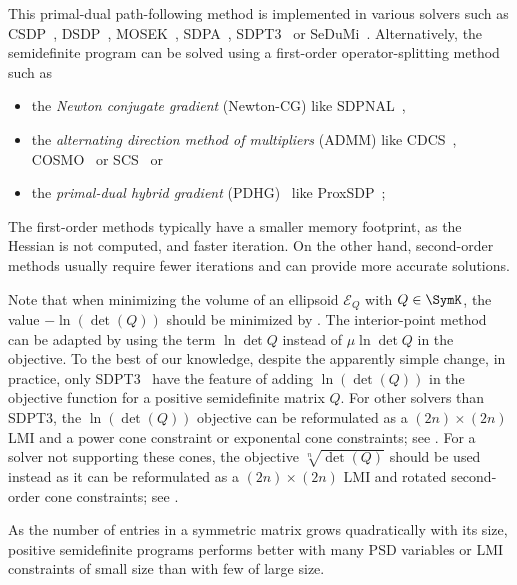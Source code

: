 \documentclass[11pt,twoside,a4paper,openright]{uclouvain-thesis}
\begin{document}
This primal-dual path-following method is implemented in various
solvers such as
    CSDP~\cite{borchers1999csdp}, %
    DSDP~\cite{dsdp1}, %
    MOSEK~\cite{mosek2017mosek81082},
    SDPA~\cite{yamashita2003implementation}, %
    SDPT3~\cite{tutuncu2003solving} or %
    SeDuMi~\cite{sturm1999using}. %
Alternatively, the semidefinite program can be solved using
a first-order operator-splitting method such as
\begin{itemize}
  \item the \emph{Newton conjugate gradient} (Newton-CG) like SDPNAL~\cite{yang2015sdpnal},
  \item the \emph{alternating direction method of multipliers} (ADMM) like CDCS~\cite{zheng2020chordal}, COSMO~\cite{garstka_2019} or SCS~\cite{ocpb:16} or
  \item the \emph{primal-dual hybrid gradient} (PDHG)~\cite{chambolle2011first} like ProxSDP~\cite{souto2018exploiting};
\end{itemize}

The first-order methods typically have a smaller memory footprint, as the Hessian is not computed,
and faster iteration.
On the other hand, second-order methods usually require fewer iterations
and can provide more accurate solutions.

\begin{myrem}
  \label{rem:sdpvol}
  Note that when minimizing the volume of an ellipsoid $\mathcal{E}_Q$ with $Q \in \SymK$,
  the value $-\ln(\det(Q))$ should be minimized by .
  The interior-point method can be adapted by using the term $\ln \det Q$ instead of $\mu \ln \det Q$ in the objective.
  To the best of our knowledge, despite the apparently simple change, in practice, only
  SDPT3~\cite{tutuncu2003solving} have the feature of adding $\ln(\det(Q))$ in the objective function for
  a positive semidefinite matrix $Q$.
  For other solvers than SDPT3, the $\ln(\det(Q))$ objective can be reformulated
  as a $(2n) \times (2n)$ LMI and a power cone constraint or exponental cone constraints; see \cite[p.~149]{ben2001lectures}.
  For a solver not supporting these cones, the objective $\sqrt[n]{\det(Q)}$
  should be used instead as it can be reformulated
  as a $(2n) \times (2n)$ LMI and rotated second-order cone constraints; see \cite[p.~149]{ben2001lectures}.
\end{myrem}

\begin{myrem}
  \label{rem:psdsize}
  As the number of entries in a symmetric matrix grows quadratically with its size,
  positive semidefinite programs performs better with many PSD variables or LMI constraints
  of small size than with few of large size. %
\end{myrem}
\end{document}

